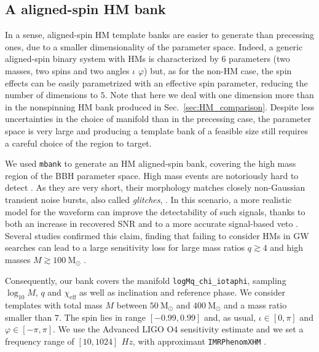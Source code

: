 \documentclass[twocolumn,showpacs,preprintnumbers,nofootinbib,prd,
superscriptaddress,10pt]{revtex4-2}
\begin{document}

\subsection{A aligned-spin HM bank} \label{sec:HM_spinning_bank}

In a sense, aligned-spin HM template banks are easier to generate than precessing ones, due to a smaller dimensionality of the parameter space. Indeed, a generic aligned-spin binary system with HMs is characterized by $6$ parameters (two masses, two spins and two angles $\iota$ $\varphi$) but, as for the non-HM case, the spin effects can be easily parametrized with an effective spin parameter, reducing the number of dimensions to $5$.
Note that here we deal with one dimension more than in the nonspinning HM bank produced in Sec.~\ref{sec:HM_comparison}.
Despite less uncertainties in the choice of manifold than in the precessing case, the parameter space is very large and producing a template bank of a feasible size still requires a careful choice of the region to target.

We used \texttt{mbank} to generate an HM aligned-spin bank, covering the high mass region of the BBH parameter space.
High mass events are notoriously hard to detect \cite{LIGOScientific:2021tfm, Chandra:2021wbw}. As they are very short, their morphology matches closely non-Gaussian transient noise bursts, also called {\it glitches}, \cite{Blackburn:2008ah, Zevin:2016qwy, LIGOScientific:2016gtq, LIGO:2021ppb}. In this scenario, a more realistic model for the waveform can improve the detectability of such signals, thanks to both an increase in recovered SNR and to a more accurate signal-based veto \cite{Babak:2005kv, PhysRevD.95.042001}.
Several studies \cite{Pekowsky:2012sr, Capano:2013raa, Varma:2014jxa, CalderonBustillo:2015lrt} confirmed this claim, finding that failing to consider HMs in GW searches can lead to a large sensitivity loss for large mass ratios $q\gtrsim 4$ and high masses $M \gtrsim \SI{100}{\mathrm{M_\odot}}$ \cite{CalderonBustillo:2016rlt}.

Consequently, our bank covers the manifold \texttt{logMq\_chi\_iotaphi}, sampling $\log_{10}M$, $q$ and $\chi_\text{eff}$ as well as inclination and reference phase.
We consider templates with total mass $M$ between $\SI{50}{\mathrm{M_\odot}}$ and $\SI{400}{\mathrm{M_\odot}}$ and a mass ratio smaller than $7$. The spin lies in range $[-0.99, 0.99]$ and, as usual, $\iota \in [0, \pi]$ and $\varphi \in [-\pi, \pi]$.
We use the Advanced LIGO O4 sensitivity estimate \cite{O4_PSDs} and we set a frequency range of $[10, 1024]\,\SI{}{Hz}$, with approximant \texttt{IMRPhenomXHM} \cite{Garcia-Quiros:2020qpx}.
\end{document}
